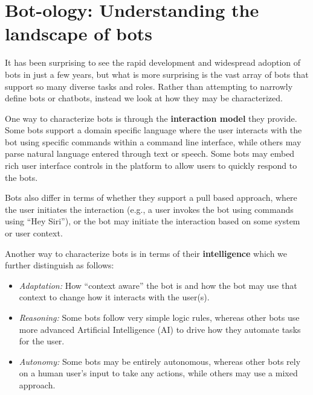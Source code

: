 \documentclass{sig-alternate}
\newcommand{\cl}[1]{\textcolor{blue}{{\it [Carly says: #1]}}}
\begin{document}
\section{Bot-ology: Understanding the landscape of bots}


It has been surprising to see the rapid development and widespread adoption of bots in just a few years, but what is more surprising is the vast array of bots that support so many diverse tasks and roles.  
Rather than attempting to narrowly define bots or chatbots, instead we look at how they may be characterized. 

One way to characterize bots is through the \textbf{interaction model} they provide. 
Some bots support a domain specific language where the user interacts with the bot using specific commands within a command line interface, while others may parse natural language entered through text or speech.  
Some bots may embed rich user interface controls in the platform to allow users to quickly respond to the bots.

Bots also differ in terms of whether they support a pull based approach, where the user initiates the interaction (e.g., a user invokes the bot using commands using ``Hey Siri''), or the bot may initiate the interaction based on some system or user context. 

Another way to characterize bots is in terms of their \textbf{intelligence} which we further distinguish as follows:
\begin{itemize}
\item \emph{Adaptation:} How ``context aware'' the bot is and how the bot may use that context to change how it interacts with the user(s). 
\item \emph{Reasoning:} Some bots follow very simple logic rules,
whereas other bots use more advanced Artificial Intelligence (AI) to drive how they automate tasks for the user.  
\item \emph{Autonomy:}  Some bots may be entirely autonomous, whereas other bots rely on a human user's input to take any actions, while others may use a mixed approach.  
\end{itemize}
\end{document}
